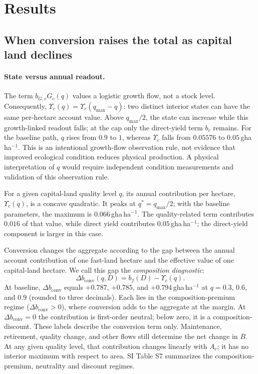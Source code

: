 \documentclass[preprint,12pt,authoryear]{elsarticle}
\newcommand{\dconv}{\Delta b_{\mathrm{conv}}}
\newcommand{\Ups}{\Upsilon_c}
\begin{document}
\section{Results}\label{sec:results}

\subsection{When conversion raises the total as capital land declines}\label{sec:mask}

\paragraph{State versus annual readout.} The term $b_{G,c}G_c(q)$ values a logistic growth flow, not a stock level. Consequently, $\Ups(q)=\Ups(q_{\max}-q)$: two distinct interior states can have the same per-hectare account value. Above $q_{\max}/2$, the state can increase while this growth-linked readout falls; at the cap only the direct-yield term $b_c$ remains. For the baseline path, $q$ rises from $0.9$ to $1$, whereas $\Ups$ falls from $0.05576$ to $0.05$\,gha\,ha$^{-1}$. This is an intentional growth-flow observation rule, not evidence that improved ecological condition reduces physical production. A physical interpretation of $q$ would require independent condition measurements and validation of this observation rule.



For a given capital-land quality level $q$, its annual contribution per hectare, $\Ups(q)$, is a concave quadratic. It peaks at $q^*=q_{\max}/2$; with the baseline parameters, the maximum is $0.066$\,gha\,ha$^{-1}$. The quality-related term contributes $0.016$ of that value, while direct yield contributes $0.05$\,gha\,ha$^{-1}$; the direct-yield component is larger in this case.

Conversion changes the aggregate according to the gap between the annual account contribution of one fast-land hectare and the effective value of one capital-land hectare. We call this gap the \emph{composition diagnostic}:
\begin{equation}\label{eq:dconv}
\dconv(q,D)=b_f(D)-\Ups(q).
\end{equation}
At baseline, $\dconv$ equals $+0.787$, $+0.785$, and $+0.794$\,gha\,ha$^{-1}$ at $q=0.3$, $0.6$, and $0.9$ (rounded to three decimals). Each lies in the composition-premium regime ($\dconv>0$), where conversion adds to the aggregate at the margin. At $\dconv=0$ the contribution is first-order neutral; below zero, it is a composition-discount. These labels describe the conversion term only. Maintenance, retirement, quality change, and other flows still determine the net change in $B$. At any given quality level, that contribution changes linearly with $A_c$; it has no interior maximum with respect to area. SI Table S7 summarizes the composition-premium, neutrality and discount regimes.
\end{document}
